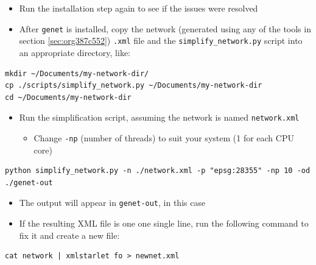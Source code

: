 \documentclass[11pt]{article}
\begin{document}
\begin{itemize}
\item Run the installation step again to see if the issues were resolved
\end{itemize}

\begin{itemize}
\item After \texttt{genet} is installed, copy the network (generated using any of the tools in section \ref{sec:org387c552}) \texttt{.xml} file and the \texttt{simplify\_network.py} script into an appropriate directory, like:
\end{itemize}
\begin{verbatim}
mkdir ~/Documents/my-network-dir/
cp ./scripts/simplify_network.py ~/Documents/my-network-dir
cd ~/Documents/my-network-dir
\end{verbatim}

\begin{itemize}
\item Run the simplification script, assuming the network is named \texttt{network.xml}
\begin{itemize}
\item Change \texttt{-np} (number of threads) to suit your system (1 for each CPU core)
\end{itemize}
\end{itemize}
\begin{verbatim}
python simplify_network.py -n ./network.xml -p "epsg:28355" -np 10 -od ./genet-out
\end{verbatim}
\begin{itemize}
\item The output will appear in \texttt{genet-out}, in this case
\item If the resulting XML file is one one single line, run the following command to fix it and create a new file:
\end{itemize}
\begin{verbatim}
cat network | xmlstarlet fo > newnet.xml
\end{verbatim}
\end{document}
